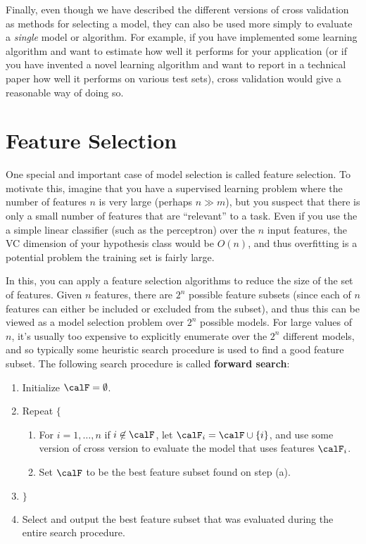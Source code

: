 \documentclass{article}
\begin{document}
Finally, even though we have described the different versions of 
cross validation as methods for selecting a model, they can 
also be used more simply to evaluate a \emph{single} model 
or algorithm.  For example, if you have implemented some learning 
algorithm and want to estimate how well it performs for your 
application (or if you have invented a novel learning algorithm 
and want to report in a technical paper how well it performs on 
various test sets), cross validation would give a reasonable
way of doing so.

\section{Feature Selection}

One special and important case of model selection is called 
feature selection.  To motivate this, imagine that you have 
a supervised learning problem where the number of features $n$ 
is very large (perhaps $n \gg m$), but you suspect that there is
only a small number of features that are ``relevant'' to a task.  
Even if you use the a simple linear classifier (such as the 
perceptron) over the $n$ input features, the VC dimension of 
your hypothesis class would be $O(n)$, and thus overfitting 
is a potential problem the training set is fairly large.

In this, you can apply a feature selection algorithms to reduce
the size of the set of features.  Given $n$ features, 
there are $2^n$ possible feature subsets (since each of $n$
features can either be included or excluded from the subset), 
and thus this can be viewed as a model selection problem over $2^n$
possible models.  For large values of $n$, it's usually too 
expensive to explicitly enumerate over the $2^n$ different models,
and so typically some heuristic search procedure is used to find a
good feature subset.  The following search procedure is called
{\bf forward search}: 
\begin{enumerate}
\item Initialize $\calF = \emptyset$. 
\item Repeat $\{$
\begin{enumerate}
\item For $i=1,\ldots,n$ if $i \not\in \calF$, let $\calF_i = \calF \cup \{i\}$,
and use some version of cross version to evaluate the model that uses features $\calF_i$.
\item Set $\calF$ to be the best feature subset found on step (a).
\end{enumerate}
\item[] $\}$ 
\item Select and output the best feature subset that was evaluated 
during the entire search procedure. 
\end{enumerate}
\end{document}
